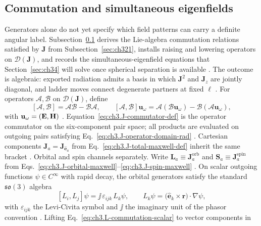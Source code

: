 \subsection{Commutation and simultaneous eigenfields}
\label{sec:ch322}
Generators alone do not yet specify which field patterns can carry a definite angular label.
Subsection~\ref{sec:ch322} derives the Lie-algebra commutation relations satisfied by
\(\mathbf{J}\) from Subsection~\ref{sec:ch321}, installs raising and lowering operators on
\(\mathcal{D}(\mathbf{J})\), and records the simultaneous-eigenfield equations that Section~\ref{sec:ch34}
will solve once spherical separation is available \cite{jackson1999}. The outcome is
algebraic: exported radiation admits a basis in which \(\mathbf{J}^{2}\) and \(\mathbf{J}_{z}\) are jointly
diagonal, and ladder moves connect degenerate partners at fixed \(\ell\) \cite{hansen1988}.
For operators \(\mathcal{A},\mathcal{B}\) on \(\mathcal{D}(\mathbf{J})\), define
\begin{equation}
\label{eq:ch3.J-commutator-def}
[\mathcal{A},\mathcal{B}]
=
\mathcal{A}\mathcal{B}-\mathcal{B}\mathcal{A},
\qquad
[\mathcal{A},\mathcal{B}]\mathbf{u}_\omega
=
\mathcal{A}(\mathcal{B}\mathbf{u}_\omega)-\mathcal{B}(\mathcal{A}\mathbf{u}_\omega),
\end{equation}
with \(\mathbf{u}_\omega=(\mathbf{E},\mathbf{H})\) \cite{jackson1999}. Equation~\eqref{eq:ch3.J-commutator-def} is the
operator commutator on the six-component pair space; all products are evaluated on outgoing pairs satisfying
Eq.~\eqref{eq:ch3.J-operator-domain-rad} \cite{stratton1941}. Cartesian components
\(\mathbf{J}_{a}=\mathbf{J}_{\hat{\mathbf{e}}_a}\) from Eq.~\eqref{eq:ch3.J-total-maxwell-def} inherit the
same bracket \cite{jackson1999}.
Orbital and spin channels separately. Write \(\mathbf{L}_{a}\equiv\mathbf{J}_{a}^{\mathrm{orb}}\) and \(\mathbf{S}_{a}\equiv\mathbf{J}_{a}^{\mathrm{spin}}\)
from Eqs.~\eqref{eq:ch3.J-orbital-maxwell}--\eqref{eq:ch3.J-spin-maxwell} \cite{belinfante1940}.
On scalar outgoing functions \(\psi\in C^{\infty}\) with rapid decay, the orbital generators satisfy the
standard \(\mathfrak{so}(3)\) algebra
\begin{equation}
\label{eq:ch3.L-commutation-scalar}
[L_i,L_j]\psi
=
\jj\,\varepsilon_{ijk}\,L_k\psi,
\qquad
L_k\psi
=
\big(\hat{\mathbf{e}}_k\times\mathbf{r}\big)\cdot\nabla\psi,
\end{equation}
with \(\varepsilon_{ijk}\) the Levi-Civita symbol and \(\jj\) the imaginary unit of the phasor convention
\cite{jackson1999}. Lifting Eq.~\eqref{eq:ch3.L-commutation-scalar} to vector components in
